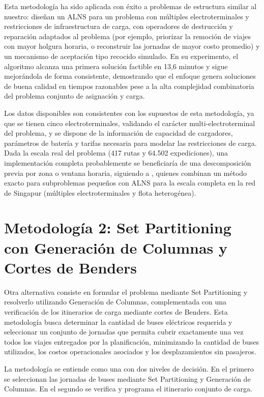 Esta metodolog\'ia ha sido aplicada con \'exito a problemas de estructura similar al nuestro:  dise\~nan un ALNS para un problema con m\'ultiples electroterminales y restricciones de infraestructura de carga, con operadores de destrucci\'on y reparaci\'on adaptados al problema (por ejemplo, priorizar la remoci\'on de viajes con mayor holgura horaria, o reconstruir las jornadas de mayor costo promedio) y un mecanismo de aceptaci\'on tipo recocido simulado. En su experimento, el algoritmo alcanza una primera soluci\'on factible en 13,6 minutos y sigue mejor\'andola de forma consistente, demostrando que el enfoque genera soluciones de buena calidad en tiempos razonables pese a la alta complejidad combinatoria del problema conjunto de asignaci\'on y carga.

Los datos disponibles son consistentes con los supuestos de esta metodolog\'ia, ya que se tienen cinco electroterminales, validando el car\'acter multi-electroterminal del problema, y se dispone de la informaci\'on de capacidad de cargadores, par\'ametros de bater\'ia y tarifas necesaria para modelar las restricciones de carga. Dada la escala real del problema (417 rutas y 64.502 expediciones), una implementaci\'on completa probablemente se beneficiar\'ia de una descomposici\'on previa por zona o ventana horaria, siguiendo a , quienes combinan un m\'etodo exacto para subproblemas peque\~nos con ALNS para la escala completa en la red de Singapur (m\'ultiples electroterminales y flota heterog\'enea).

\section{Metodolog\'ia 2: Set Partitioning con Generaci\'on de Columnas y Cortes de Benders \label{sec:metodologia2}}

Otra alternativa consiste en formular el problema mediante Set Partitioning y resolverlo utilizando Generaci\'on de Columnas, complementada con una verificaci\'on de los itinerarios de carga mediante cortes de Benders. Esta metodolog\'ia busca determinar la cantidad de buses el\'ectricos requerida y seleccionar un conjunto de jornadas que permita cubrir exactamente una vez todos los viajes entregados por la planificaci\'on, minimizando la cantidad de buses utilizados, los costos operacionales asociados y los desplazamientos sin pasajeros.

La metodolog\'ia se entiende como una con dos niveles de decisi\'on. En el primero se seleccionan las jornadas de buses mediante Set Partitioning y Generaci\'on de Columnas. En el segundo se verifica y programa el itinerario conjunto de carga.


